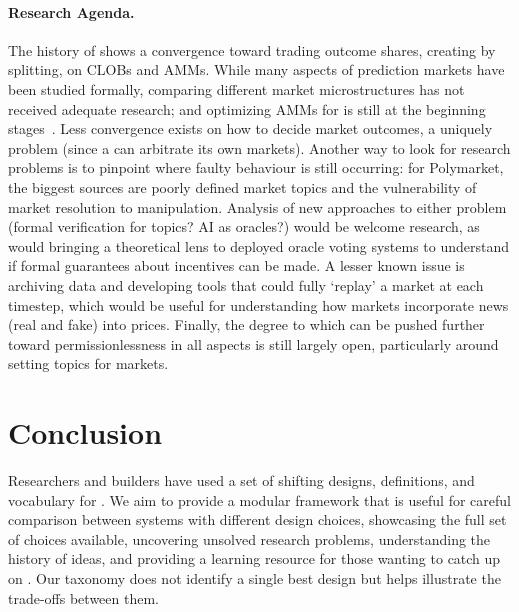 \paragraph{Research Agenda.}

The history of \depm shows a convergence toward trading outcome shares, creating by splitting, on CLOBs and AMMs. While many aspects of prediction markets have been studied formally, comparing different market microstructures has not received adequate research; and optimizing AMMs for \depms is still at the beginning stages~\cite{KS23,MR24}. Less convergence exists on how to decide market outcomes, a uniquely \depm problem (since a \cepm can arbitrate its own markets). Another way to look for research problems is to pinpoint where faulty behaviour is still occurring: for Polymarket, the biggest sources are poorly defined market topics and the vulnerability of market resolution to manipulation. Analysis of new approaches to either problem (formal verification for topics? AI as oracles?) would be welcome research, as would bringing a theoretical lens to deployed oracle voting systems to understand if formal guarantees about incentives can be made. A lesser known issue is archiving \depm data and developing tools that could fully `replay' a market at each timestep, which would be useful for understanding how markets incorporate news (real and fake) into prices. Finally, the degree to which \depms can be pushed further toward permissionlessness in all aspects is still largely open, particularly around setting topics for markets.

\section{Conclusion}

Researchers and builders have used a set of shifting designs, definitions, and vocabulary for \depms. We aim to provide a modular framework that is useful for careful comparison between systems with different design choices, showcasing the full set of choices available, uncovering unsolved research problems, understanding the history of \depm ideas, and providing a learning resource for those wanting to catch up on \depms. Our taxonomy does not identify a single best design but helps illustrate the trade-offs between them. 



